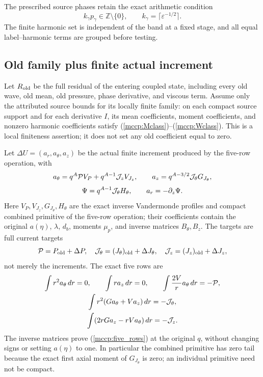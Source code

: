 \documentclass[11pt]{article}
\begin{document}
The prescribed source phases retain the exact arithmetic condition
\begin{equation}\label{mccp:phase_arithmetic}
 k_\gamma p_\gamma\in\mathbb Z\setminus\{0\},\qquad
 k_\gamma=\lceil\varepsilon^{-1/2}\rceil .
\end{equation}
The finite harmonic set is independent of the band at a fixed stage, and
all equal label--harmonic terms are grouped before testing.

\subsection{Old family plus finite actual increment}

Let $R_{\rm old}$ be the full residual of the entering coupled state,
including every old wave, old mean, old pressure, phase derivative, and
viscous term. Assume only the attributed source bounds for its locally
finite family: on each compact source support and for each derivative
$I$, its mean coefficients, moment coefficients, and nonzero harmonic
coefficients satisfy (\ref{mccp:Mclass})--(\ref{mccp:Wclass}). This is a
local finiteness assertion; it does not set any old coefficient equal to
zero.

Let $\Delta U=(a_r,a_\theta,a_z)$ be the actual finite increment produced
by the five-row operation, with
\[
 a_\theta=q^A{\cal P}V_P+q^{A-1}{\cal J}_zV_{J_z},
 \qquad a_z=q^{A-3/2}{\cal J}_\theta G_{J_\theta},
\]
\[
 \Psi=q^{A-1}{\cal J}_\theta H_\theta,
 \qquad a_r=-\partial_z\Psi.
\]
Here $V_P,V_{J_z},G_{J_\theta},H_\theta$ are the exact inverse
Vandermonde profiles and compact combined primitive of the five-row
operation; their coefficients contain the original $a(\eta)$,
$\lambda$, $d_b$, moments $\mu_p$, and inverse matrices $B_\theta,B_z$.
The targets are full current targets
\[
 {\cal P}=P_{\rm old}+\Delta P,\quad
 {\cal J}_\theta=(J_\theta)_{\rm old}+\Delta J_\theta,\quad
 {\cal J}_z=(J_z)_{\rm old}+\Delta J_z,
\]
not merely the increments. The exact five rows are
\begin{equation}\label{mccp:five_rows}
\begin{gathered}
 \int r^2a_\theta\,dr=0,\qquad \int ra_z\,dr=0,\qquad
 \int \frac{2V}{r}a_\theta\,dr=-{\cal P},\\
 \int r^2(Ga_\theta+Va_z)\,dr=-{\cal J}_\theta,\\
 \int(2rGa_z-rVa_\theta)\,dr=-{\cal J}_z.
\end{gathered}
\end{equation}
The inverse matrices prove (\ref{mccp:five_rows}) at the original $q$,
without changing signs or setting $a(\eta)$ to one. In particular the
combined primitive has zero tail because the exact first axial moment of
$G_{J_\theta}$ is zero; an individual primitive need not be compact.
\end{document}
